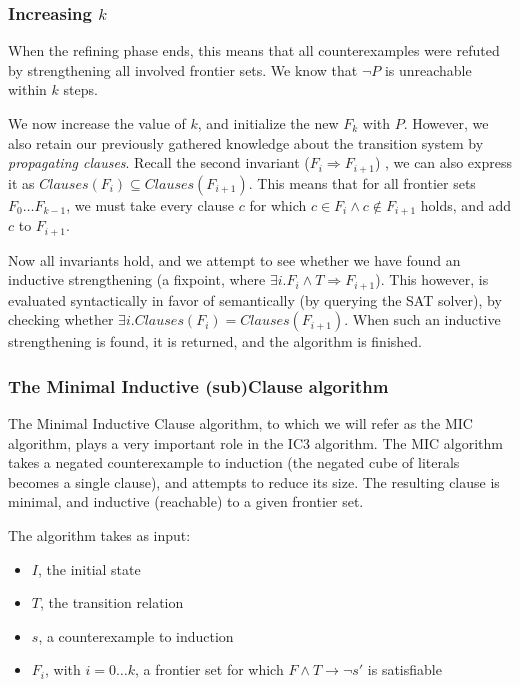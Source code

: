 \documentclass[a4paper]{article}
\begin{document}
\subsubsection{Increasing $k$}
When the refining phase ends, this means that all counterexamples were refuted by strengthening all involved frontier sets. We know %
that $\lnot P$ is unreachable within $k$ steps.

We now increase the value of $k$, and initialize the new $F_k$ with $P$.
However, we also retain our previously gathered knowledge about the transition system by \emph{propagating clauses}. Recall the second invariant ($F_i \Rightarrow F_{i+1}$) , we can also express it as $Clauses(F_i) \subseteq Clauses(F_{i+1})$. This means that for all frontier sets $F_0 \ldots F_{k-1}$, we must take every clause $c$ for which $c \in F_i \land c\notin F_{i+1}$ holds, and add $c$ to $F_{i+1}$.

Now all invariants hold, and we attempt to see whether we have found an inductive strengthening (a fixpoint, where $\exists i. F_i \land T \Rightarrow F_{i+1}$). This however, is evaluated syntactically in favor of semantically (by querying the SAT solver), by checking whether $\exists i. Clauses(F_i) = Clauses(F_{i+1})$. When such an inductive strengthening is found, it is returned, and the algorithm is finished.

\subsubsection{The Minimal Inductive (sub)Clause algorithm}
\label{sec:MIC}
The Minimal Inductive Clause algorithm, to which we will refer as the MIC algorithm, plays a very important role in the IC3 algorithm. The MIC algorithm takes a negated counterexample to induction (the negated cube of literals becomes a single clause), and attempts to reduce its size. The resulting clause is minimal, and inductive (reachable) to a given frontier set.

The algorithm takes as input:
\begin{itemize}
\item $I$, the initial state
\item $T$, the transition relation
\item $s$, a counterexample to induction
\item $F_i$, with $i=0 \ldots k$, a frontier set for which $F \land T \rightarrow \lnot s'$ is satisfiable
\end{itemize}
\end{document}
